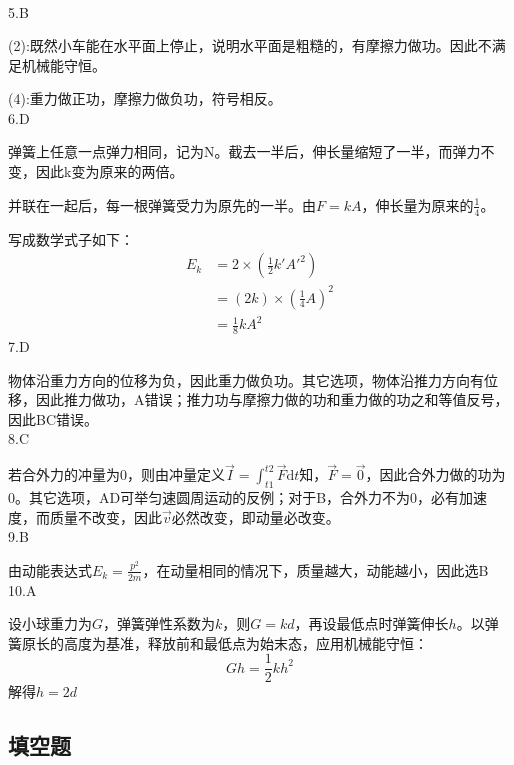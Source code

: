 \documentclass[blue, normal]{./templete/qyxfnote}
\newcommand{\di}[1]{\mathrm{d}#1}
\begin{document}
\begin{multicols}{2}
\begin{align*}
	\end{align*}
	5.B\par
	(2):既然小车能在水平面上停止，说明水平面是粗糙的，有摩擦力做功。因此不满足机械能守恒。\par
	(4):重力做正功，摩擦力做负功，符号相反。\\
	6.D\par
	弹簧上任意一点弹力相同，记为N。截去一半后，伸长量缩短了一半，而弹力不变，因此k变为原来的两倍。\par
	并联在一起后，每一根弹簧受力为原先的一半。由$F=kA$，伸长量为原来的$\frac{1}{4}$。\par
	写成数学式子如下：
	\begin{align*}
	E_k &=2\times\left(\frac{1}{2}k'A'^2\right)\\
	&=\left(2k\right)\times\left(\frac{1}{4}A\right)^2\\
	&=\frac{1}{8}kA^2
	\end{align*}
	7.D\par 
	物体沿重力方向的位移为负，因此重力做负功。其它选项，物体沿推力方向有位移，因此推力做功，A错误；推力功与摩擦力做的功和重力做的功之和等值反号，因此BC错误。\\
	8.C\par 
	若合外力的冲量为0，则由冲量定义$\vec{I}=\int_{t1}^{t2}\vec{F}\di{t}$知，$\vec{F}=\vec{0}$，因此合外力做的功为0。其它选项，AD可举匀速圆周运动的反例；对于B，合外力不为0，必有加速度，而质量不改变，因此$\vec{v}$必然改变，即动量必改变。\\
	9.B\par 
	由动能表达式$E_k=\frac{p^2}{2m}$，在动量相同的情况下，质量越大，动能越小，因此选B\\
	10.A\par 
	设小球重力为$G$，弹簧弹性系数为$k$，则$G=kd$，再设最低点时弹簧伸长$h$。以弹簧原长的高度为基准，释放前和最低点为始末态，应用机械能守恒：
	\[Gh=\frac{1}{2}kh^2\]
	解得$h=2d$
	
	\subsection{填空题}
	

\end{multicols}
\end{document}
